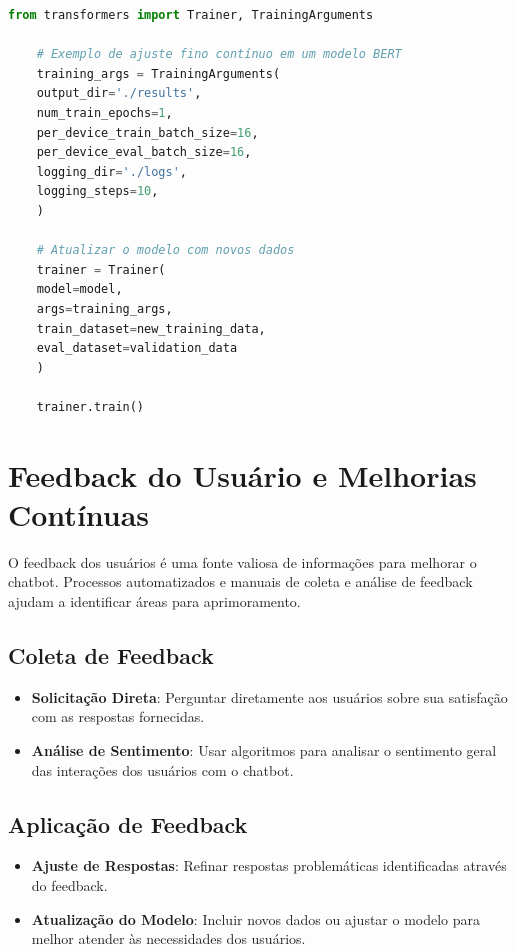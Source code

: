 \documentclass[14pt,a4paper,oneside]{book}
\begin{document}
\begin{lstlisting}[language=Python]
	from transformers import Trainer, TrainingArguments
	
	# Exemplo de ajuste fino contínuo em um modelo BERT
	training_args = TrainingArguments(
	output_dir='./results',
	num_train_epochs=1,
	per_device_train_batch_size=16,
	per_device_eval_batch_size=16,
	logging_dir='./logs',
	logging_steps=10,
	)
	
	# Atualizar o modelo com novos dados
	trainer = Trainer(
	model=model,
	args=training_args,
	train_dataset=new_training_data,
	eval_dataset=validation_data
	)
	
	trainer.train()
\end{lstlisting}

\section{Feedback do Usuário e Melhorias Contínuas}

O feedback dos usuários é uma fonte valiosa de informações para melhorar o chatbot. Processos automatizados e manuais de coleta e análise de feedback ajudam a identificar áreas para aprimoramento.

\subsection{Coleta de Feedback}

\begin{itemize}
	\item \textbf{Solicitação Direta}: Perguntar diretamente aos usuários sobre sua satisfação com as respostas fornecidas.
	\item \textbf{Análise de Sentimento}: Usar algoritmos para analisar o sentimento geral das interações dos usuários com o chatbot.
\end{itemize}

\subsection{Aplicação de Feedback}

\begin{itemize}
	\item \textbf{Ajuste de Respostas}: Refinar respostas problemáticas identificadas através do feedback.
	\item \textbf{Atualização do Modelo}: Incluir novos dados ou ajustar o modelo para melhor atender às necessidades dos usuários.
\end{itemize}
\end{document}

